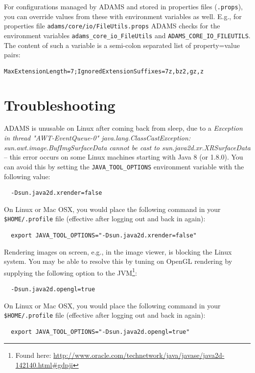For configurations managed by ADAMS and stored in properties files (\texttt{.props}),
you can override values from these with environment variables as well.
E.g., for properties file \texttt{adams/core/io/FileUtils.props} ADAMS checks for
the environment variables \texttt{adams\_core\_io\_FileUtils} and \texttt{ADAMS\_CORE\_IO\_FILEUTILS}.
The content of such a variable is a semi-colon separated list of property=value pairs:
\begin{verbatim}
MaxExtensionLength=7;IgnoredExtensionSuffixes=7z,bz2,gz,z
\end{verbatim}

\section{Troubleshooting}
\begin{tight_itemize}
  \item ADAMS is unusable on Linux after coming back from sleep, due to a
  \textit{Exception in thread "AWT-EventQueue-0" java.lang.ClassCastException:
  sun.awt.image.BufImgSurfaceData cannot be cast to sun.java2d.xr.XRSurfaceData}
  -- this error occurs on some Linux machines starting with Java 8 (or 1.8.0).
  You can avoid this by setting the \texttt{JAVA\_TOOL\_OPTIONS} environment variable with the following value:
  \begin{verbatim}
  -Dsun.java2d.xrender=false
  \end{verbatim}
  On Linux or Mac OSX, you would place the following command in your
  \texttt{\$HOME/.profile} file (effective after logging out and back in again):
  \begin{verbatim}
  export JAVA_TOOL_OPTIONS="-Dsun.java2d.xrender=false"
  \end{verbatim}

  \item Rendering images on screen, e.g., in the image viewer, is blocking the
  Linux system. You may be able to resolve this by tuning on OpenGL rendering
  by supplying the following option to the JVM\footnote{Found here: \url{http://www.oracle.com/technetwork/java/javase/java2d-142140.html\#gdpji}{}}:
  \begin{verbatim}
  -Dsun.java2d.opengl=true
  \end{verbatim}
  On Linux or Mac OSX, you would place the following command in your
  \texttt{\$HOME/.profile} file (effective after logging out and back in again):
  \begin{verbatim}
  export JAVA_TOOL_OPTIONS="-Dsun.java2d.opengl=true"
  \end{verbatim}
\end{tight_itemize}

